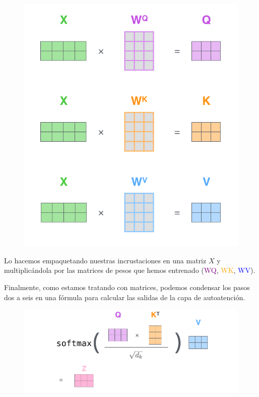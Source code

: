 \begin{figure}[h]
  \centering
  \includegraphics[scale=0.25]{pics/self-attention-matrix-calculation.png}
\end{figure}

Lo hacemos empaquetando nuestras incrustaciones en una matriz $X$ y multiplicándola por las matrices de pesos que hemos entrenado (\textcolor{purple}{WQ}, \textcolor{orange}{WK}, \textcolor{blue}{WV}).

Finalmente, como estamos tratando con matrices, podemos condensar los pasos dos a seis en una fórmula para calcular las salidas de la capa de autoatención.

\begin{figure}[h]
  \centering
  \includegraphics[scale=0.35]{pics/self-attention-matrix-calculation-2.png}
\end{figure}

